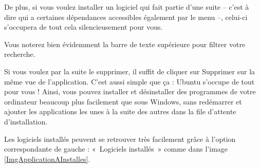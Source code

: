 {De plus, si vous voulez installer un logiciel qui fait partie d'une suite -- c'est à dire qui a certaines dépendances accessibles également par le menu --, celui-ci s'occupera de tout cela silencieusement pour vous.\par
{}
\begin{nota}
Vous noterez bien évidemment la barre de texte supérieure pour filtrer votre recherche.
\end{nota}
Si vous voulez par la suite le supprimer, il suffit de cliquer sur Supprimer sur la même vue de l'application. C'est aussi simple que ça : Ubuntu s'occupe de tout pour vous ! Ainsi, vous pouvez installer et désinstaller des programmes de votre ordinateur beaucoup plus facilement que sous Windows, sans redémarrer et ajouter les applications les unes à la suite des autres dans la file d'attente d'installation.\par
Les logiciels installés peuvent se retrouver très facilement grâce à l'option correspondante de gauche : «~Logiciels installés~» comme dans l'image \ref{ImgApplicationAInstalles}.
}
